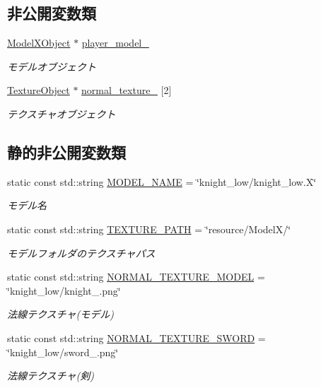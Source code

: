 \subsection*{非公開変数類}
\begin{DoxyCompactItemize}
\item 
\mbox{\hyperlink{class_model_x_object}{Model\+X\+Object}} $\ast$ \mbox{\hyperlink{class_player_draw_a01943b6dec9856ef843f7afc0f8b4c02}{player\+\_\+model\+\_\+}}
\begin{DoxyCompactList}\small\item\em モデルオブジェクト \end{DoxyCompactList}\item 
\mbox{\hyperlink{class_texture_object}{Texture\+Object}} $\ast$ \mbox{\hyperlink{class_player_draw_ac106fde46e38f5ac7f33de5cc5f6fd76}{normal\+\_\+texture\+\_\+}} \mbox{[}2\mbox{]}
\begin{DoxyCompactList}\small\item\em テクスチャオブジェクト \end{DoxyCompactList}\end{DoxyCompactItemize}
\subsection*{静的非公開変数類}
\begin{DoxyCompactItemize}
\item 
static const std\+::string \mbox{\hyperlink{class_player_draw_a924cd73d9d8b1b2e662be2c79238354f}{M\+O\+D\+E\+L\+\_\+\+N\+A\+ME}} = \char`\"{}knight\+\_\+low/knight\+\_\+low.\+X\char`\"{}
\begin{DoxyCompactList}\small\item\em モデル名 \end{DoxyCompactList}\item 
static const std\+::string \mbox{\hyperlink{class_player_draw_a808cb174528d55fb35a35b161e262e16}{T\+E\+X\+T\+U\+R\+E\+\_\+\+P\+A\+TH}} = \char`\"{}resource/ModelX/\char`\"{}
\begin{DoxyCompactList}\small\item\em モデルフォルダのテクスチャパス \end{DoxyCompactList}\item 
static const std\+::string \mbox{\hyperlink{class_player_draw_a509edc24db83efdfeda88f12d1d6cc8c}{N\+O\+R\+M\+A\+L\+\_\+\+T\+E\+X\+T\+U\+R\+E\+\_\+\+M\+O\+D\+EL}} = \char`\"{}knight\+\_\+low/knight\+\_.\+png\char`\"{}
\begin{DoxyCompactList}\small\item\em 法線テクスチャ(モデル) \end{DoxyCompactList}\item 
static const std\+::string \mbox{\hyperlink{class_player_draw_aa64bacc93024e21558e2dd9227937bdb}{N\+O\+R\+M\+A\+L\+\_\+\+T\+E\+X\+T\+U\+R\+E\+\_\+\+S\+W\+O\+RD}} = \char`\"{}knight\+\_\+low/sword\+\_.\+png\char`\"{}
\begin{DoxyCompactList}\small\item\em 法線テクスチャ(剣) \end{DoxyCompactList}\end{DoxyCompactItemize}


